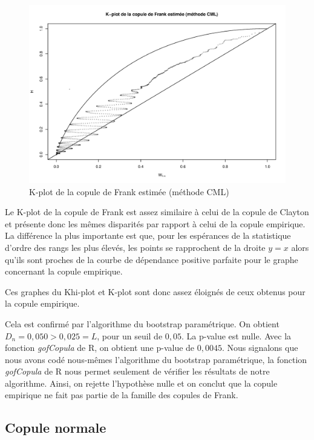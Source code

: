 \noindent%
\begin{figure}[H]
    \begin{center}
      \includegraphics[width=17 cm, angle=0]{./pictures/frankcmlkplot.png}
      \centering\caption{\label{2}K-plot de la copule de Frank estimée (méthode CML)}
    \end{center}
\end{figure}

Le K-plot de la copule de Frank est assez similaire à celui de la copule de Clayton et présente donc les mêmes disparités par rapport à celui de la copule empirique. La différence la plus importante est que, pour les espérances de la statistique d'ordre des rangs les plus élevés, les points se rapprochent de la droite $y=x$ alors qu'ils sont proches de la courbe de dépendance positive parfaite pour le graphe concernant la copule empirique.

Ces graphes du Khi-plot et K-plot sont donc assez éloignés de ceux obtenus pour la copule empirique.

Cela est confirmé par l'algorithme du bootstrap paramétrique. On obtient $D_n = 0,050 > 0,025 = L$, pour un seuil de $0,05$. La p-value est nulle. Avec la fonction \textit{gofCopula} de R, on obtient une p-value de $0,0045$. 
Nous signalons que nous avons codé nous-mêmes l'algorithme du bootstrap paramétrique, la fonction \textit{gofCopula} de R nous permet seulement de vérifier les résultats de notre algorithme. 
Ainsi, on rejette l'hypothèse nulle et on conclut que la copule empirique ne fait pas partie de la famille des copules de Frank.

\subsection{Copule normale}

